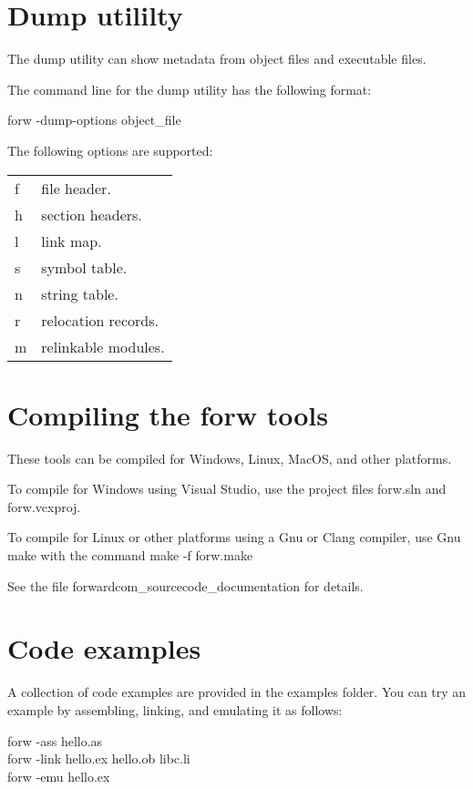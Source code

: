 \documentclass[forwardcom.tex]{subfiles}
\begin{document}
\section{Dump utililty} \label{dumpUtililty}

The dump utility can show metadata from object files and executable files.
\vv

The command line for the dump utility has the following format:
\vv

\hspace{5mm} {\ttfamily forw -dump-options object\_file }
\vv

The following options are supported:\\
\begin{tabular}{|p{10mm}p{150mm}|}
\hline
f & file header.\\
h & section headers.\\
l & link map.\\
s & symbol table.\\
n & string table.\\
r & relocation records.\\
m & relinkable modules.\\
\hline
\end{tabular}
\vv


\section{Compiling the forw tools} \label{compilingForw}
These tools can be compiled for Windows, Linux, MacOS, and other platforms. 
\vv

To compile for Windows using Visual Studio, use the project files forw.sln and  forw.vcxproj.
\vv

To compile for Linux or other platforms using a Gnu or Clang compiler, use Gnu make with the command make -f forw.make
\vv

See the file forwardcom\_sourcecode\_documentation for details.
\vv


\section{Code examples} \label{codeExamples}
A collection of code examples are provided in the examples folder. You can try an example by assembling, linking, and emulating it as follows:
\vv

forw -ass hello.as \\
forw -link hello.ex hello.ob libc.li \\
forw -emu hello.ex
\vv
\end{document}
